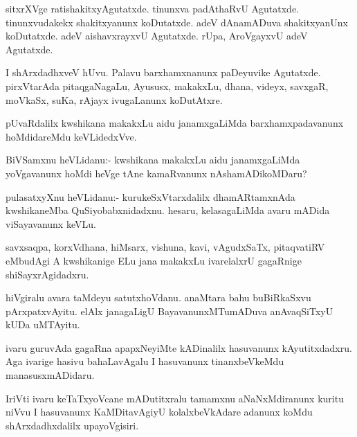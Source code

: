 \documentclass{article}
\begin{document}
\begin{mn}
sitxrXVge ratishakitxyAgutatxde. tinunxva padAthaRvU
Agutatxde. tinunxvudakekx shakitxyanunx koDutatxde. adeV dAnamADuva
shakitxyanUnx koDutatxde. adeV aishavxrayxvU Agutatxde. rUpa,
AroVgayxvU adeV Agutatxde. 
\end{mn}

\begin{mn}
I shArxdadhxveV hUvu. Palavu barxhamxnanunx paDeyuvike
Agutatxde. pirxVtarAda pitaqgaNagaLu, Ayususx, makakxLu, dhana,
videyx, savxgaR, moVkaSx, suKa, rAjayx ivugaLanunx koDutAtxre.
\end{mn}

\begin{mn}%
pUvaRdalilx kwshikana makakxLu aidu janamxgaLiMda barxhamxpadavanunx
hoMdidareMdu keVLidedxVve.
\end{mn}

\begin{mn}
BiVSamxnu heVLidanu:- kwshikana makakxLu aidu janamxgaLiMda
yoVgavanunx hoMdi heVge tAne kamaRvanunx nAshamADikoMDaru?
\end{mn}

\begin{mn}
pulasatxyXnu heVLidanu:- kurukeSxVtarxdalilx dhamARtamxnAda
kwshikaneMba QuSiyobabxnidadxnu. hesaru, kelasagaLiMda avaru mADida
viSayavanunx keVLu.
\end{mn}

\begin{mn}
savxsaqpa, korxVdhana, hiMsarx, vishuna, kavi, vAgudxSaTx, pitaqvatiRV
eMbudAgi A kwshikanige ELu jana makakxLu ivarelalxrU gagaRnige shiSayxrAgidadxru.
\end{mn}

\begin{mn}
hiVgiralu avara taMdeyu satutxhoVdanu. anaMtara bahu buBiRkaSxvu
pArxpatxvAyitu. elAlx janagaLigU BayavanunxMTumADuva anAvaqSiTxyU kUDa uMTAyitu.
\end{mn}

\begin{mn}%
ivaru guruvAda gagaRna apapxNeyiMte kADinalilx hasuvanunx
kAyutitxdadxru. Aga ivarige hasivu bahaLavAgalu I hasuvanunx
tinanxbeVkeMdu manasusxmADidaru.
\end{mn}

\begin{mn}
IriVti ivaru keTaTxyoVcane mADutitxralu tamamxnu aNaNxMdiranunx kuritu
niVvu I hasuvanunx KaMDitavAgiyU kolalxbeVkAdare adanunx koMdu
shArxdadhxdalilx upayoVgisiri.
\end{mn}
\end{document}
